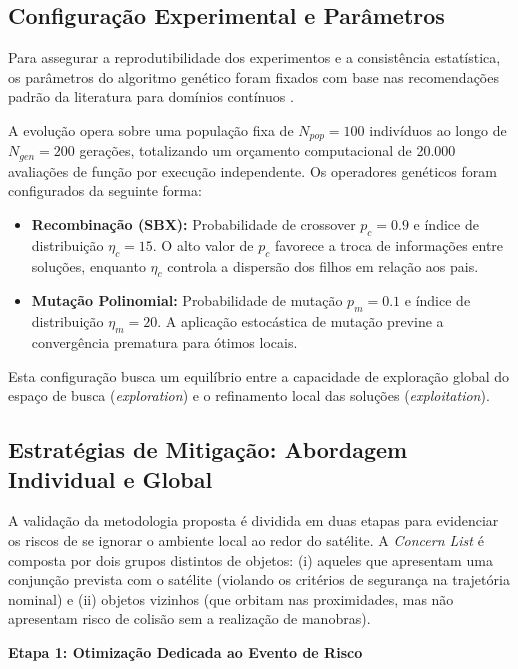 \subsection{Configuração Experimental e Parâmetros}

Para assegurar a reprodutibilidade dos experimentos e a consistência estatística, os parâmetros do algoritmo genético foram fixados com base nas recomendações padrão da literatura para domínios contínuos \cite{Deb2001}.

A evolução opera sobre uma população fixa de $N_{pop} = 100$ indivíduos ao longo de $N_{gen} = 200$ gerações, totalizando um orçamento computacional de 20.000 avaliações de função por execução independente. Os operadores genéticos foram configurados da seguinte forma:

\begin{itemize}
    \item \textbf{Recombinação (SBX):} Probabilidade de crossover $p_c = 0.9$ e índice de distribuição $\eta_c = 15$. O alto valor de $p_c$ favorece a troca de informações entre soluções, enquanto $\eta_c$ controla a dispersão dos filhos em relação aos pais.
    \item \textbf{Mutação Polinomial:} Probabilidade de mutação $p_m = 0.1$ e índice de distribuição $\eta_m = 20$. A aplicação estocástica de mutação previne a convergência prematura para ótimos locais.
\end{itemize}

Esta configuração busca um equilíbrio entre a capacidade de exploração global do espaço de busca (\textit{exploration}) e o refinamento local das soluções (\textit{exploitation}).

\subsection{Estratégias de Mitigação: Abordagem Individual e Global}
\label{subsec:mitigation_strategies}

A validação da metodologia proposta é dividida em duas etapas para evidenciar os riscos de se ignorar o ambiente local ao redor do satélite. A \textit{Concern List} é composta por dois grupos distintos de objetos: (i) aqueles que apresentam uma conjunção prevista com o satélite (violando os critérios de segurança na trajetória nominal) e (ii) objetos vizinhos (que orbitam nas proximidades, mas não apresentam risco de colisão sem a realização de manobras).

\textbf{Etapa 1: Otimização Dedicada ao Evento de Risco}

